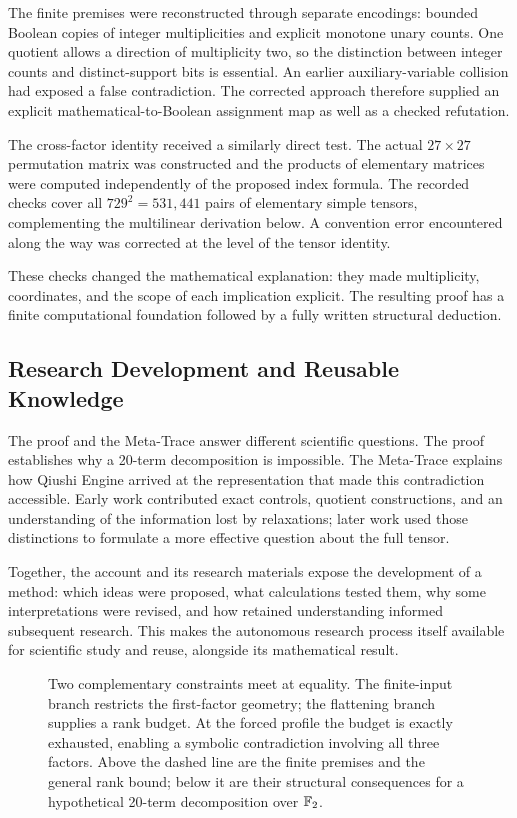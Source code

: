 The finite premises were reconstructed through separate encodings:
bounded Boolean copies of integer multiplicities and explicit monotone
unary counts. One quotient allows a direction of multiplicity two, so
the distinction between integer counts and distinct-support bits is
essential. An earlier auxiliary-variable collision had exposed a false
contradiction. The corrected approach therefore supplied an explicit
mathematical-to-Boolean assignment map as well as a checked refutation.

The cross-factor identity received a similarly direct test. The actual
$27\times27$ permutation matrix was constructed and the products of
elementary matrices were computed independently of the proposed index
formula. The recorded checks cover all $729^2=531{,}441$ pairs of
elementary simple tensors, complementing the multilinear derivation
below. A convention error encountered along the way was corrected at
the level of the tensor identity.

These checks changed the mathematical explanation: they made multiplicity,
coordinates, and the scope of each implication explicit. The resulting
proof has a finite computational foundation followed by a fully written
structural deduction.

\subsection{Research Development and Reusable Knowledge}

The proof and the Meta-Trace answer different scientific questions.
The proof establishes why a 20-term decomposition is impossible.
The Meta-Trace explains how Qiushi Engine arrived at the representation
that made this contradiction accessible. Early work contributed exact
controls, quotient constructions, and an understanding of the information
lost by relaxations; later work used those distinctions to formulate a
more effective question about the full tensor.

Together, the account and its research materials expose the development
of a method: which ideas were proposed, what calculations tested them,
why some interpretations were revised, and how retained understanding
informed subsequent research. This makes the autonomous research
process itself available for scientific study and reuse, alongside its
mathematical result.

\begin{figure}[tbp]
  \centering
  \makebox[\linewidth][c]{\unskip}
  \caption{Two complementary constraints meet at equality.
  The finite-input branch restricts the first-factor geometry; the
  flattening branch supplies a rank budget. At the forced profile the
  budget is exactly exhausted, enabling a symbolic contradiction involving
  all three factors. Above the dashed line are the finite premises and
  the general rank bound; below it are their structural consequences
  for a hypothetical 20-term decomposition over $\mathbb{F}_2$.}
  \label{fig:proof-structure}
\end{figure}
\FloatBarrier
